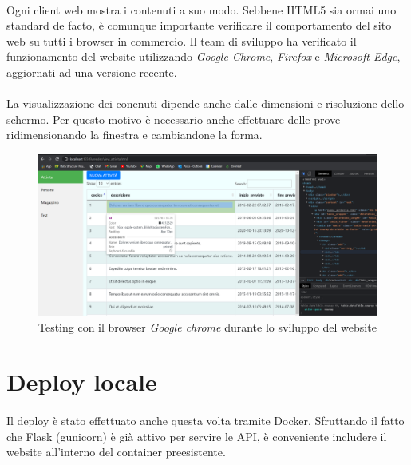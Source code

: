 \documentclass[12pt,a4paper,twoside,english,italian]{book}
\begin{document}
\paragraph{} Ogni client web mostra i contenuti a suo modo. Sebbene HTML5 sia ormai uno standard de facto, è comunque importante verificare il comportamento del sito web su tutti i browser in commercio. Il team di sviluppo ha verificato il funzionamento del website utilizzando \emph{Google Chrome}, \emph{Firefox} e \emph{Microsoft Edge}, aggiornati ad una versione recente.

\paragraph{} La visualizzazione dei conenuti dipende anche dalle dimensioni e risoluzione dello schermo. Per questo motivo è necessario anche effettuare delle prove ridimensionando la finestra e cambiandone la forma. 

\begin{figure}[H]
    \centering
    \includegraphics[width=1\textwidth]{img/prova_chrome.png}
    \caption{Testing con il browser \emph{Google chrome} durante lo sviluppo del website}
\end{figure}


\section{Deploy locale}

\paragraph{} Il deploy è stato effettuato anche questa volta tramite Docker. Sfruttando il fatto che Flask (gunicorn) è già attivo per servire le API, è conveniente includere il website all'interno del container preesistente. 

\newpage
\end{document}
